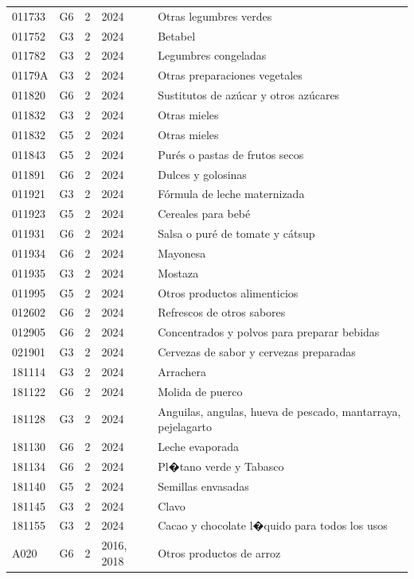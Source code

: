 \begin{table}[ht]
\begin{tabular}{llrll}
  011733 & G6 &   2 & 2024 & Otras legumbres verdes \\ 
  011752 & G3 &   2 & 2024 & Betabel \\ 
  011782 & G3 &   2 & 2024 & Legumbres congeladas \\ 
  01179A & G3 &   2 & 2024 & Otras preparaciones vegetales \\ 
  011820 & G6 &   2 & 2024 & Sustitutos de azúcar y otros azúcares \\ 
  011832 & G3 &   2 & 2024 & Otras mieles \\ 
  011832 & G5 &   2 & 2024 & Otras mieles \\ 
  011843 & G5 &   2 & 2024 & Purés o pastas de frutos secos \\ 
  011891 & G6 &   2 & 2024 & Dulces y golosinas \\ 
  011921 & G3 &   2 & 2024 & Fórmula de leche maternizada \\ 
  011923 & G5 &   2 & 2024 & Cereales para bebé \\ 
  011931 & G6 &   2 & 2024 & Salsa o puré de tomate y cátsup \\ 
  011934 & G6 &   2 & 2024 & Mayonesa \\ 
  011935 & G3 &   2 & 2024 & Mostaza \\ 
  011995 & G5 &   2 & 2024 & Otros productos alimenticios \\ 
  012602 & G6 &   2 & 2024 & Refrescos de otros sabores \\ 
  012905 & G6 &   2 & 2024 & Concentrados y polvos para preparar bebidas \\ 
  021901 & G3 &   2 & 2024 & Cervezas de sabor y cervezas preparadas \\ 
  181114 & G3 &   2 & 2024 & Arrachera \\ 
  181122 & G6 &   2 & 2024 & Molida de puerco \\ 
  181128 & G3 &   2 & 2024 & Anguilas, angulas, hueva de pescado, mantarraya, pejelagarto \\ 
  181130 & G6 &   2 & 2024 & Leche evaporada \\ 
  181134 & G6 &   2 & 2024 & Pl�tano verde y Tabasco \\ 
  181140 & G5 &   2 & 2024 & Semillas envasadas \\ 
  181145 & G3 &   2 & 2024 & Clavo \\ 
  181155 & G3 &   2 & 2024 & Cacao y chocolate l�quido para todos los usos \\ 
  A020 & G6 &   2 & 2016, 2018 & Otros productos de arroz \\ 

\end{tabular}
\end{table}
